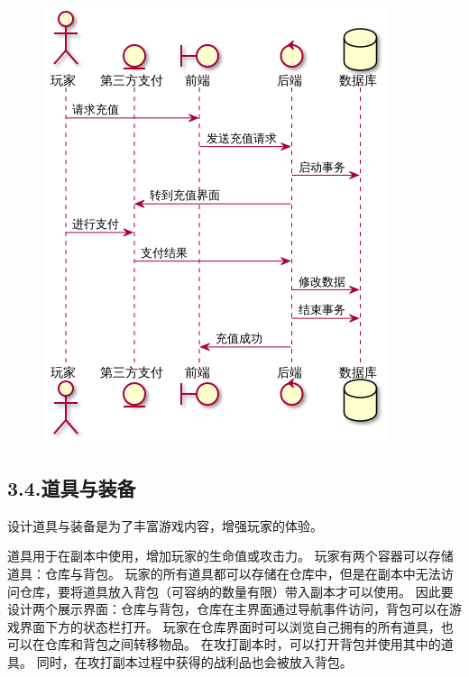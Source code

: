 \documentclass{article}
\begin{document}
\begin{figure}[tbp]%
\begin{mdcenter}%

\noindent{}\includegraphics[keepaspectratio=true]{./img/9}{}%

\mdhr{}%

\noindent{}%
\end{mdcenter}%
\end{figure}%

\subsection{3.4.\hspace*{0.5em}道具与装备}\label{34}%

\noindent{}设计道具与装备是为了丰富游戏内容，增强玩家的体验。%

道具用于在副本中使用，增加玩家的生命值或攻击力。 玩家有两个容器可以存储道具：仓库与背包。 玩家的所有道具都可以存储在仓库中，但是在副本中无法访问仓库，要将道具放入背包（可容纳的数量有限）带入副本才可以使用。 因此要设计两个展示界面：仓库与背包，仓库在主界面通过导航事件访问，背包可以在游戏界面下方的状态栏打开。 玩家在仓库界面时可以浏览自己拥有的所有道具，也可以在仓库和背包之间转移物品。 在攻打副本时，可以打开背包并使用其中的道具。 同时，在攻打副本过程中获得的战利品也会被放入背包。%
\end{document}
